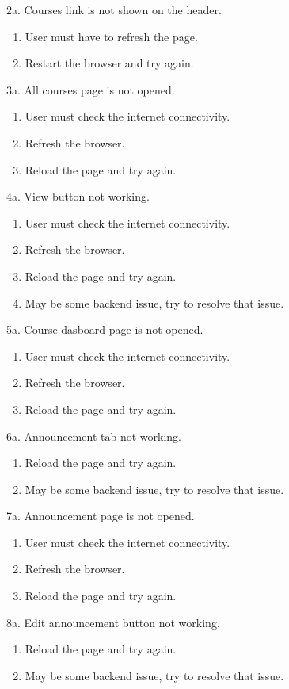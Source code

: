 \documentclass[12pt]{article}
\begin{document}
2a. Courses link is not shown on the header.
\begin{enumerate}
\item User must have to refresh the page.
\item Restart the browser and try again.
\end{enumerate} 
3a. All courses page is not opened.
\begin{enumerate}
\item User must check the internet connectivity.
\item Refresh the browser.
\item Reload the page and try again.
\end{enumerate}
4a. View button not working.
\begin{enumerate}
\item User must check the internet connectivity.
\item Refresh the browser.
\item Reload the page and try again.
\item May be some backend issue, try to resolve that issue.
\end{enumerate}
5a. Course dasboard page is not opened.
\begin{enumerate}
\item User must check the internet connectivity.
\item Refresh the browser.
\item Reload the page and try again.
\end{enumerate}
6a. Announcement tab not working.
\begin{enumerate}
\item Reload the page and try again.
\item May be some backend issue, try to resolve that issue.
\end{enumerate}
7a. Announcement page is not opened.
\begin{enumerate}
\item User must check the internet connectivity.
\item Refresh the browser.
\item Reload the page and try again.
\end{enumerate}
8a. Edit announcement button not working.
\begin{enumerate}
\item Reload the page and try again.
\item May be some backend issue, try to resolve that issue.
\end{enumerate}
\end{document}
